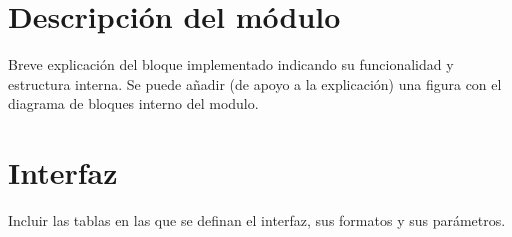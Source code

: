 \documentclass[parskip,a4paper,12pt]{article}
\newcommand{\fila}{}
\begin{document}
\setcounter{tcb@cnt@enunciado}{9}
\renewcommand{\tablename}{Tabla}
\addtocounter{page}{-1}
\startcontents[sections]
\thispagestyle{empty}

\clearpage
\printmyminitoc




\section{Descripción del módulo}
\begin{enunciado}{}{}%
Breve explicación del bloque implementado indicando su funcionalidad y estructura interna. Se puede añadir (de apoyo a la explicación) una figura con el diagrama de bloques interno del modulo.
\end{enunciado}


\section{Interfaz}
\begin{enunciado}{}{}%
Incluir las tablas en las que se definan el interfaz, sus formatos y sus parámetros. 
\end{enunciado}



\def\colUNO{2cm}
\def\colDOS{1cm}
\def\colTRES{2.0cm}
\def\colCUATRO{10cm}

\begin{table}[H]
    \caption{Interfaz del módulo  DP\_mod}
    \label{tab:interfaz}
\gdef\cabecera{\fila{NOMBRE}{TIPO}{FORMATO}{DESCRIPCIÓN}}
\noindent\begin{mitabla}
\fila{}{}{}{} 
\fila{}{}{}{} 
\fila{}{}{}{} 
\fila{}{}{}{} 
\fila{}{}{}{} 
\fila{}{}{}{} 
\fila{}{}{}{} 
\fila{}{}{}{} 
\fila{}{}{}{} 
\fila{}{}{}{} 
\end{mitabla}
\end{table}

\end{document}
